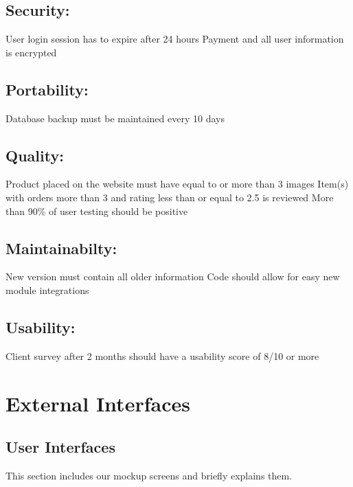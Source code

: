 \subsection*{Security:}
\begin{outline}
    \1 User login session has to expire after 24 hours
    \1 Payment and all user information is encrypted
\end{outline}

\subsection*{Portability:}
\begin{outline}
    \1 Database backup must be maintained every 10 days
\end{outline}

\subsection*{Quality:}
\begin{outline}
    \1 Product placed on the website must have equal to or more than 3 images
    \1 Item(s) with orders more than 3 and rating less than or equal to 2.5 is reviewed
    \1 More than 90\% of user testing should be positive 
\end{outline}

\subsection*{Maintainabilty:}
\begin{outline}
    \1 New version must contain all older information
    \1 Code should allow for easy new module integrations
\end{outline}

\subsection*{Usability:}
\begin{outline}
    \1 Client survey after 2 months should have a usability score of 8/10 or more
\end{outline}

\section{External Interfaces}

\subsection{User Interfaces}
This section includes our mockup screens and briefly explains them.

